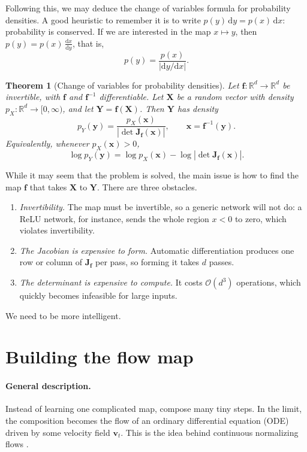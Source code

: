 \documentclass[11pt,a4paper]{article}
\numberwithin{equation}{section}     %
\theoremstyle{plain}        %
\newtheorem{theorem}{Theorem}[section]
\theoremstyle{definition}   %
\theoremstyle{remark}       %
\begin{document}
Following this, we may deduce the change of variables formula for probability densities. A good heuristic to remember it is to write $p(y)\,\mathrm{d}y=p(x)\,\mathrm{d}x$: probability is conserved. If we are interested in the map $x\mapsto y$, then $p(y)=p(x)\,\frac{\mathrm{d}x}{\mathrm{d}y}$, that is,
\[
p(y)=\frac{p(x)}{\left|\mathrm{d}y/\mathrm{d}x\right|} .
\]

\begin{theorem}[Change of variables for probability densities]\label{thm:cov}
Let $\mathbf{f}:\mathbb{R}^d\to\mathbb{R}^d$ be invertible, with $\mathbf{f}$ and $\mathbf{f}^{-1}$ differentiable. Let $\mathbf{X}$ be a random vector with density $p_X:\mathbb{R}^d\to[0,\infty)$, and let $\mathbf{Y}=\mathbf{f}(\mathbf{X})$. Then $\mathbf{Y}$ has density
\[
p_Y(\mathbf{y})=\frac{p_X(\mathbf{x})}{\left|\det\mathbf{J}_{\mathbf{f}}(\mathbf{x})\right|},\qquad\mathbf{x}=\mathbf{f}^{-1}(\mathbf{y}).
\]
Equivalently, whenever $p_X(\mathbf{x})>0$,
\[
\log p_Y(\mathbf{y})=\log p_X(\mathbf{x})-\log\left|\det\mathbf{J}_{\mathbf{f}}(\mathbf{x})\right| .
\]
\end{theorem}

While it may seem that the problem is solved, the main issue is how to find the map $\mathbf{f}$ that takes $\mathbf{X}$ to $\mathbf{Y}$. There are three obstacles.
\begin{enumerate}
\item \emph{Invertibility.} The map must be invertible, so a generic network will not do: a ReLU network, for instance, sends the whole region $x<0$ to zero, which violates invertibility.
\item \emph{The Jacobian is expensive to form.} Automatic differentiation produces one row or column of $\mathbf{J}_{\mathbf{f}}$ per pass, so forming it takes $d$ passes.
\item \emph{The determinant is expensive to compute.} It costs $\mathcal{O}(d^3)$ operations, which quickly becomes infeasible for large inputs.
\end{enumerate}
We need to be more intelligent.

\newpage

\section{Building the flow map}

\paragraph{General description.} Instead of learning one complicated map, compose many tiny steps. In the limit, the composition becomes the flow of an ordinary differential equation (ODE) driven by some velocity field $\mathbf{v}_t$. This is the idea behind continuous normalizing flows \citep{chen2018,grathwohl2019}.
\end{document}
